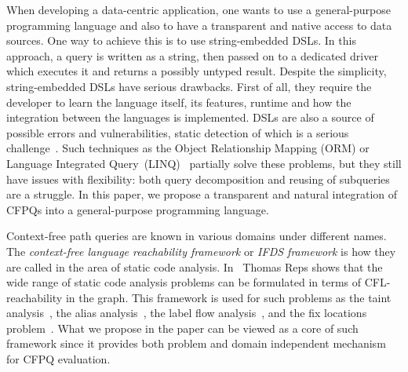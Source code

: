 When developing a data-centric application, one wants to use a general-purpose programming language and also to have a transparent and native access to data sources. 
One way to achieve this is to use string-embedded DSLs. 
In this approach, a query is written as a string, then passed on to a dedicated driver which executes it and returns a possibly untyped result.
Despite the simplicity, string-embedded DSLs have serious drawbacks. 
First of all, they require the developer to learn the language itself, its features, runtime and how the integration between the languages is implemented. 
DSLs are also a source of possible errors and vulnerabilities, static detection of which is a serious challenge~\cite{stringEmbeddedLanguagesProblem}. 
Such techniques as the Object Relationship Mapping (ORM) or Language Integrated Query~(LINQ)~\cite{LINQ1, LINQ2, LinqRDF} partially solve these problems, but they still have issues with flexibility: both query decomposition and  reusing of subqueries are a struggle. 
In this paper, we propose a transparent and natural integration of CFPQs into a general-purpose programming language.




Context-free path queries are known in various domains under different names. The \emph{context-free language reachability framework} or  \emph{IFDS framework} is how they are called in the area of static code analysis. 
In~\cite{Reps:1995, Reps} Thomas Reps shows that the wide range of static code analysis problems can be formulated in terms of CFL-reachability in the graph. 
This framework is used for such problems as the taint analysis~\cite{CFLTaint}, the alias analysis~\cite{JavaCFL, Zheng, CFLGraspan}, the label flow analysis~\cite{LabelFlowCFLReachability}, and the fix locations problem~\cite{CFLfinding}.
What we propose in the paper can be viewed as a core of such framework since it provides both problem and domain independent mechanism for CFPQ evaluation. 

